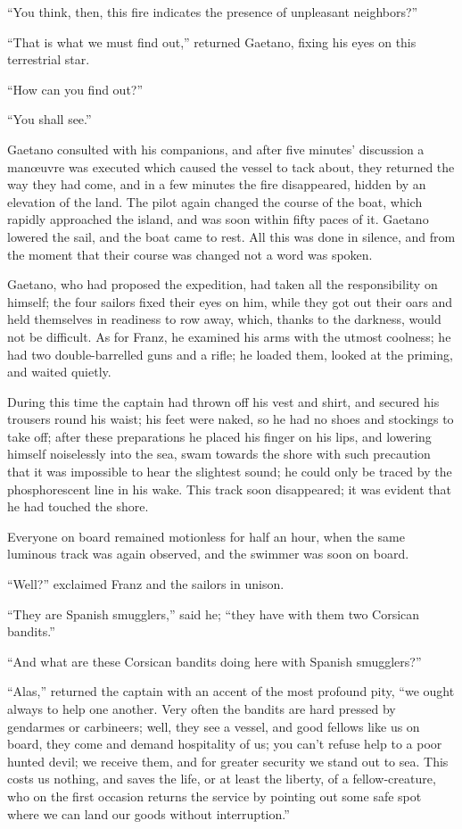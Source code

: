 “You think, then, this fire indicates the presence of unpleasant
neighbors?”

“That is what we must find out,” returned Gaetano, fixing his eyes on
this terrestrial star.

“How can you find out?”

“You shall see.”

Gaetano consulted with his companions, and after five minutes’
discussion a manœuvre was executed which caused the vessel to tack
about, they returned the way they had come, and in a few minutes the
fire disappeared, hidden by an elevation of the land. The pilot again
changed the course of the boat, which rapidly approached the island,
and was soon within fifty paces of it. Gaetano lowered the sail, and
the boat came to rest. All this was done in silence, and from the
moment that their course was changed not a word was spoken.

Gaetano, who had proposed the expedition, had taken all the
responsibility on himself; the four sailors fixed their eyes on him,
while they got out their oars and held themselves in readiness to row
away, which, thanks to the darkness, would not be difficult. As for
Franz, he examined his arms with the utmost coolness; he had two
double-barrelled guns and a rifle; he loaded them, looked at the
priming, and waited quietly.

During this time the captain had thrown off his vest and shirt, and
secured his trousers round his waist; his feet were naked, so he had no
shoes and stockings to take off; after these preparations he placed his
finger on his lips, and lowering himself noiselessly into the sea, swam
towards the shore with such precaution that it was impossible to hear
the slightest sound; he could only be traced by the phosphorescent line
in his wake. This track soon disappeared; it was evident that he had
touched the shore.

Everyone on board remained motionless for half an hour, when the same
luminous track was again observed, and the swimmer was soon on board.

“Well?” exclaimed Franz and the sailors in unison.

“They are Spanish smugglers,” said he; “they have with them two
Corsican bandits.”

“And what are these Corsican bandits doing here with Spanish
smugglers?”

“Alas,” returned the captain with an accent of the most profound pity,
“we ought always to help one another. Very often the bandits are hard
pressed by gendarmes or carbineers; well, they see a vessel, and good
fellows like us on board, they come and demand hospitality of us; you
can’t refuse help to a poor hunted devil; we receive them, and for
greater security we stand out to sea. This costs us nothing, and saves
the life, or at least the liberty, of a fellow-creature, who on the
first occasion returns the service by pointing out some safe spot where
we can land our goods without interruption.”

